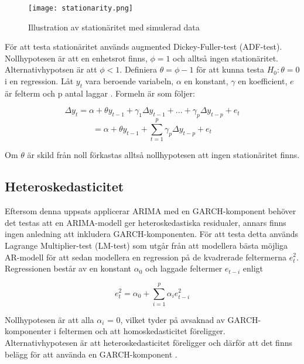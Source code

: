 \documentclass[11pt]{article}
\numberwithin{equation}{section}
\numberwithin{table}{section}
\numberwithin{figure}{section}
\begin{document}
\begin{figure}[H]
\caption{Illustration av stationäritet med simulerad data}
\texttt{[image: stationarity.png]}
\centering
\end{figure}

För att testa stationäritet används augmented Dickey-Fuller-test (ADF-test). Nollhypotesen är att en enhetsrot finns, \(\phi=1\) och alltså ingen stationäritet. Alternativhypotsen är att \(\phi<1\). Definiera \(\theta = \phi -1 \) för att kunna testa \(H_0:\theta=0\) i en regression. Låt \(y_t\) vara beroende variabeln, \( \alpha \) en konstant, \( \gamma \) en koefficient, \(e\) är felterm och p antal laggar \parencite[][,s.610 ff.]{wooldridge2018introductory}. Formeln är som följer:

\begin{equation}
    \Delta y_t = \alpha + \theta y_{t-1} + \gamma_1\Delta y_{t-1} + ... + \gamma_p\Delta y_{t-p} + e_t
\end{equation}
\begin{equation}
        = \alpha + \theta y_{t-1} + \sum_{t=1}^{p}\gamma_p \Delta y_{t-p} + e_t
\end{equation}

Om \(\theta\) är skild från noll förkastas alltså nollhypotesen att ingen stationäritet finns.

\subsection{Heteroskedasticitet}

Eftersom denna uppsats applicerar ARIMA med en GARCH-komponent behöver det testas att en ARIMA-modell ger heteroskedastiska residualer, annars finns ingen anledning att inkludera GARCH-komponenten. För att testa detta används Lagrange Multiplier-test (LM-test) som utgår från att modellera bästa möjliga AR-modell för att sedan modellera en regression på de kvadrerade feltermerna \(e_t^2\). Regressionen består av en konstant \(\alpha_0\) och laggade feltermer \(e_{t-i}\) enligt

\begin{equation}
    e_t^2=\alpha_0+\sum_{i=1}^{p}\alpha_ie_{t-i}^2
\end{equation}

Nollhypotesen är att alla \(\alpha_i\) = 0, vilket tyder på avsaknad av GARCH-komponenter i feltermen och att homoskedasticitet föreligger. Alternativhypotesen är att heteroskedasticitet föreligger och därför att det finns belägg för att använda en GARCH-komponent \parencite{engle1982autoregressive}. 
\end{document}
